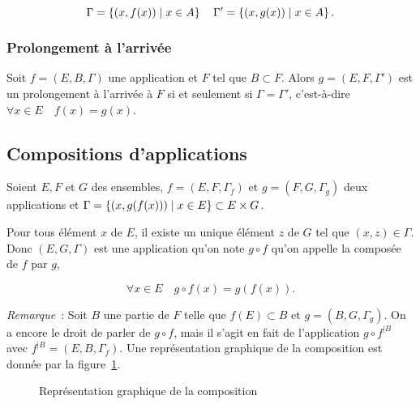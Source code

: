\begin{equation}
    \Gamma=\left\{(x,f(x))\mathrel{}\middle|\mathrel{}x \in A\right\} \quad \Gamma'=\left\{(x,g(x))\mathrel{}\middle|\mathrel{}x \in A\right\}.
\end{equation}

\subsubsection{Prolongement à l'arrivée}
\label{chap3-subsubsec:prolongementarr}

Soit \(f=(E,B,\Gamma)\) une application et \(F\) tel que \(B \subset F\). Alors 
\(g=(E,F,\Gamma')\) est un prolongement à l'arrivée à \(F\) si et seulement si 
\(\Gamma = \Gamma'\), c'est-à-dire \(\forall x \in E \quad f(x)=g(x)\).

\subsection{Compositions d'applications}
\label{chap3-subsec:compapp}

\begin{defdef}
    Soient \(E,F\) et \(G\) des ensembles, \(f=(E,F,\Gamma_f)\) et \(g=(F,G, 
    \Gamma_g)\) deux applications et \(\Gamma = \left\{(x,g(f(x)))\mathrel{}\middle|\mathrel{}x \in E\right\} \subset 
    E \times G\).
\end{defdef}

Pour tous élément \(x\) de \(E\), il existe un unique élément \(z\) de \(G\) tel 
que \((x,z) \in \Gamma\). Donc \((E,G,\Gamma)\) est une application qu'on note 
\(g \circ f\) qu'on appelle la composée de \(f\) par \(g\),

\begin{equation}
    \forall x \in E \quad g \circ f(x)=g(f(x)).
\end{equation}

\emph{Remarque}~: Soit \(B\) une partie de \(F\) telle que \(f(E) \subset B\) et 
\(g=(B,G,\Gamma_g)\). On a encore le droit de parler de \(g \circ f\), mais il 
s'agit en fait de l'application \(g \circ f^{|B}\) avec \( f^{|B} 
=(E,B,\Gamma_f)\). Une représentation graphique de la composition est donnée par la 
figure~\ref{chap3-fig:compose}.

\begin{figure}
    \centering
    \caption{Représentation graphique de la composition}
    \label{chap3-fig:compose}
\end{figure}

